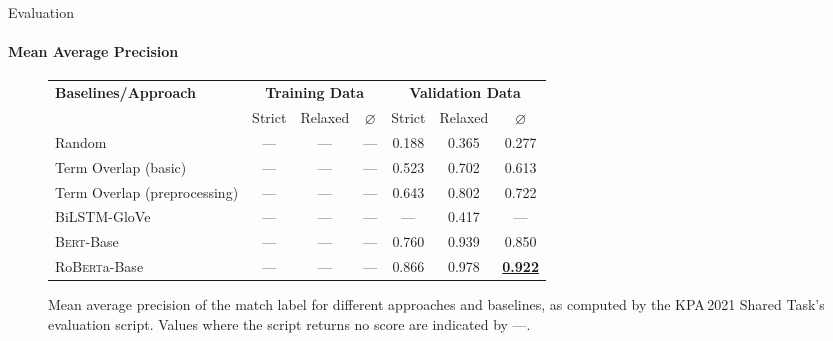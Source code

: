 \documentclass[english,handout]{mlutalk}
\newcommand{\BiLSTM}{\mbox{BiLSTM}\xspace}
\newcommand{\Bert}{\textsc{Bert}\xspace}
\newcommand{\BertBase}{\Bert-Base\xspace}
\newcommand{\Roberta}{\mbox{Ro\textsc{Bert}a}\xspace}
\newcommand{\RobertaBase}{\Roberta-Base\xspace}
\renewcommand{\lg}{\color{lightgray}}
\begin{document}
\begin{frame}{Evaluation}
  \framesubtitle{Mean Average Precision}
  \begin{figure}
    \centering
    \caption{Mean average precision of the match label for different approaches and baselines, as computed by the KPA\,2021 Shared Task's evaluation script.
    Values where the script returns no score are indicated by ---.}
    \scriptsize
    \begin{tabular}{lcccccc}
      \toprule
      \textbf{Baselines/Approach} & \multicolumn{3}{c}{\textbf{Training Data}} & \multicolumn{3}{c}{\textbf{Validation Data}} \\
      \cmidrule(r{0.5em}){2-4} \cmidrule(l{0.5em}){5-7}
      & Strict & Relaxed & \(\varnothing\) & Strict & Relaxed & \(\varnothing\) \\
      \midrule
      Random 
      & --- & --- & --- & 0.188 & 0.365 & 0.277 \\
      Term Overlap (basic)
      & --- & --- & --- & 0.523 & 0.702 & 0.613 \\
      Term Overlap (preprocessing)
      & --- & --- & --- & 0.643 & 0.802 & 0.722 \\
      \midrule
      \lg\BiLSTM-GloVe
      & \lg--- & \lg--- & \lg--- & \lg--- & \lg0.417 & \lg--- \\
      \BertBase
      & --- & --- & --- & 0.760 & 0.939 & 0.850 \\
      \RobertaBase
      & --- & --- & --- & 0.866 & 0.978 & \textbf{\underline{0.922}} \\
      \bottomrule
    \end{tabular}
  \end{figure}
\end{frame}
\end{document}
